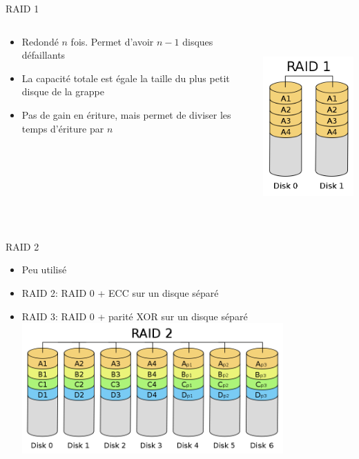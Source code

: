 \begin{frame}[fragile=singleslide]{RAID 1}
  \begin{columns}
    \begin{column}{6cm}
  \begin{itemize} 
    \item Redondé $n$ fois. Permet d'avoir $n-1$ disques défaillants
    \item La capacité totale est  égale la taille du plus petit disque
      de la grappe
    \item Pas  de gain  en ériture, mais  permet de diviser  les temps
      d'ériture par $n$
    \end{itemize}  
    \end{column}
    \begin{column}{4cm}
      \includegraphics[height=7cm]{pics/RAID_1}
    \end{column}
  \end{columns}
\end{frame}

\begin{frame}[fragile=singleslide]{RAID 2}
  \begin{itemize} 
  \item Peu utilisé
  \item RAID 2: RAID 0 + ECC sur un disque séparé
  \item RAID 3: RAID 0 +  parité XOR  sur un disque séparé
  \includegraphics[height=5cm]{pics/RAID_2}
\end{itemize}
\end{frame}

